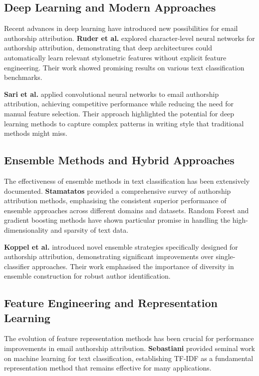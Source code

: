 \documentclass[11pt,a4paper]{article}
\begin{document}
\subsection{Deep Learning and Modern Approaches}

Recent advances in deep learning have introduced new possibilities for email authorship attribution. \textbf{Ruder et al.} \cite{ruder2016character} explored character-level neural networks for authorship attribution, demonstrating that deep architectures could automatically learn relevant stylometric features without explicit feature engineering. Their work showed promising results on various text classification benchmarks.

\textbf{Sari et al.} \cite{sari2018author} applied convolutional neural networks to email authorship attribution, achieving competitive performance while reducing the need for manual feature selection. Their approach highlighted the potential for deep learning methods to capture complex patterns in writing style that traditional methods might miss.

\subsection{Ensemble Methods and Hybrid Approaches}

The effectiveness of ensemble methods in text classification has been extensively documented. \textbf{Stamatatos} \cite{stamatatos2009survey} provided a comprehensive survey of authorship attribution methods, emphasising the consistent superior performance of ensemble approaches across different domains and datasets. Random Forest and gradient boosting methods have shown particular promise in handling the high-dimensionality and sparsity of text data.

\textbf{Koppel et al.} \cite{koppel2011authorship} introduced novel ensemble strategies specifically designed for authorship attribution, demonstrating significant improvements over single-classifier approaches. Their work emphasised the importance of diversity in ensemble construction for robust author identification.

\subsection{Feature Engineering and Representation Learning}

The evolution of feature representation methods has been crucial for performance improvements in email authorship attribution. \textbf{Sebastiani} \cite{sebastiani2002machine} provided seminal work on machine learning for text classification, establishing TF-IDF as a fundamental representation method that remains effective for many applications.
\end{document}
